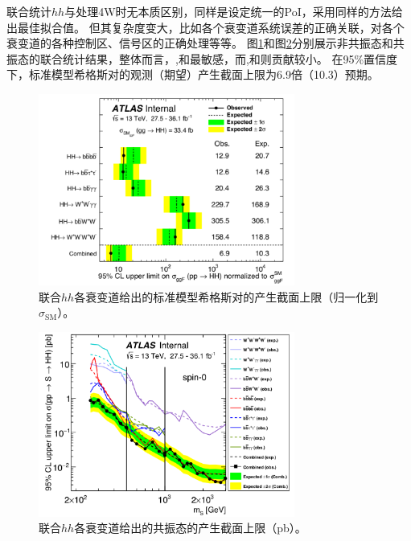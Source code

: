 联合统计$hh$与处理4W时无本质区别，同样是设定统一的PoI，采用同样的方法给出最佳拟合值。
但其复杂度变大，比如各个衰变道系统误差的正确关联，对各个衰变道的各种控制区、信号区的正确处理等等。
图\ref{fig:HH_combined_nonres}和图\ref{fig:HH_combined_res}分别展示非共振态和共振态的联合统计结果，整体而言，\bbbb ,\bbtt 和\bbaa 最敏感，而\wwaa ,\bbww 和\wwww 则贡献较小。
在95\%置信度下，标准模型希格斯对的观测（期望）产生截面上限为6.9倍（10.3）预期。
\begin{figure}[h]
\centering
 \includegraphics[width=0.75\textwidth]{fig/HH_combined_nonres.png}
 \caption{联合$hh$各衰变道给出的标准模型希格斯对的产生截面上限（归一化到$\sigma_{\text{SM}}$）。}
 \label{fig:HH_combined_nonres}
\end{figure}

\begin{figure}[h]
\centering
 \includegraphics[width=0.75\textwidth]{fig/HH_combined_res.png}
 \caption{联合$hh$各衰变道给出的共振态的产生截面上限（pb）。}
 \label{fig:HH_combined_res}
\end{figure}

